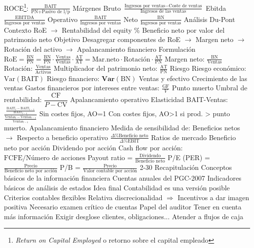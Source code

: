 \documentclass{nuevotema}
\begin{document}
\begin{esquemal}
				\4 ROCE\footnote{\textit{Return on Capital Employed} o retorno sobre el capital empleado}: $\frac{\text{BAIT}}{\text{PN}+\text{Pasivo de l/p}}$
			\3 Márgenes
				\4 Bruto
				\4[] $\frac{\text{Ingresos por ventas} - \text{Coste de ventas}}{\text{Ingresos de las ventas}}$
				\4 Ebitda
				\4[] $\frac{\text{EBITDA}}{\text{Ingresos por ventas}}$
				\4 Operativo
				\4[] $\frac{\text{BAIT}}{\text{Ingresos por ventas}}$
				\4 Neto
				\4[] $\frac{\text{BN}}{\text{Ingresos por ventas}}$
			\3 Análisis Du-Pont
				\4 Contexto
				\4[] RoE
				\4[] $\to$ Rentabilidad del equity
				\4[] \% Beneficio neto por valor del patrimonio neto
				\4 Objetivo
				\4[] Desagregar componentes de RoE
				\4[] $\to$ Margen neto
				\4[] $\to$ Rotación del activo
				\4[] $\to$ Apalancamiento financiero
				\4 Formulación
				\4[] $\text{RoE} = \frac{\text{BN}}{\text{PN}} = \frac{\text{BN}}{\text{PN}} \cdot \frac{\text{Ventas}}{\text{Ventas}} \cdot \frac{\text{AT}}{\text{AT}} = \text{Mar.neto} \cdot \text{Rotación} \cdot \frac{\text{AT}}{\text{PN}} $
				\4[] Margen neto: $\frac{\text{BN}}{\text{Ventas}}$
				\4[] Rotación: $\frac{\text{Ventas}}{\text{Activos}}$
				\4[] Multiplicador del patrimonio neto: $\frac{\text{AT}}{\text{PN}}$
			\3 Riesgo
				\4 Riesgo económico: $\text{Var}(\text{BAIT})$
				\4 Riesgo financiero: $\textbf{Var}( \text{BN})$
			\3 Ventas y efectivo
				\4 Crecimiento de las ventas
				\4 Gastos financieros por intereses entre ventas: $\frac{\text{GF}}{V}$
			\3 Punto muerto
				\4 Umbral de rentabilidad: $\dfrac{\text{CF}}{P - \text{CV}}$
			\3 Apalancamiento operativo
				\4 Elasticidad BAIT-Ventas: $\frac{\frac{ \text{BAIT}_t - \text{BAIT}_{t-1} }{ \text{BAIT}_{t-1}} }{\frac{ \text{Ventas}_t - \text{Ventas}_{t-1} }{ \text{Ventas}_{t-1} }}$
				\4 Sin costes fijos, AO=1
				\4 Con costes fijos, AO>1 si prod. > punto muerto.
			\3 Apalancamiento financiero
				\4 Medida de sensibilidad de:
				\4[] Beneficios netos
				\4[] $\to$ Respecto a beneficio operativo
				\4 $\frac{\Delta \% \text{Beneficio neto}}{\Delta \% \text{EBIT}}$
			\3 Ratios de mercado
				\4 Beneficio neto por acción
				\4 Dividendo por acción
				\4 Cash flow por acción: $\text{FCFE}/\text{Número de acciones}$
				\4 Payout ratio = $\frac{\text{Dividendo}}{\text{Beneficio neto}}$
				\4 P/E (PER) = $\frac{\text{Precio}}{\text{Beneficio neto por acción}}$
				\4 P/B = $\frac{\text{Precio}}{\text{Valor contable por acción}}$
	\1[]  2-30
		\2 Recapitulación
			\3 Conceptos básicos de la información financiera
			\3 Cuentas anuales del PGC-2007
			\3 Indicadores básicos de análisis de estados
		\2 Idea final
			\3 Contabilidad es una versión posible
				\4 Criterios contables flexibles
				\4 Relativa discrecionalidad
				\4[] $\Rightarrow$ Incentivos a dar imagen positiva
			\3 Necesario examen crítico de cuentas
				\4 Papel del auditor
				\4 Tener en cuenta más información
				\4 Exigir desglose clientes, obligaciones...
				\4 Atender a flujos de caja
\end{esquemal}
\end{document}

